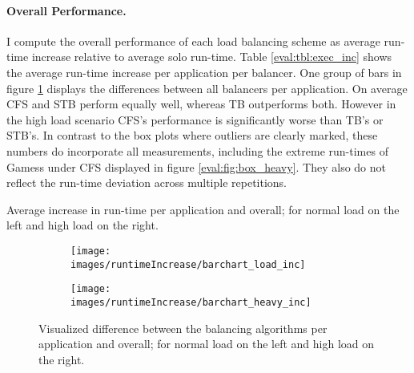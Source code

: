 \paragraph{Overall Performance.}
I compute the overall performance of each load balancing scheme as average
run-time increase relative to average solo run-time.
Table \ref{eval:tbl:exec_inc} shows the average run-time increase per
application per balancer.
One group of bars in figure \ref{eval:fig:exec_inc} displays the differences
between all balancers per application.
On average CFS and STB perform equally well, whereas TB outperforms both.
However in the high load scenario CFS's performance is significantly worse
than TB's or STB's.
In contrast to the box plots where outliers are clearly marked, these numbers
do incorporate all measurements, including the extreme
run-times of Gamess under CFS displayed in figure \ref{eval:fig:box_heavy}.
They also do not reflect the run-time deviation across multiple repetitions.
%
\begin{table}[h!]
  
  \caption{Average increase in run-time per application and overall; for
    normal load on the left and high load on the right.}
  \label{eval:tbl:exec_inc}
\end{table}
%
\begin{figure}[h!]
  \begin{subfigure}{.49\textwidth}
  \texttt{[image: images/runtimeIncrease/barchart\_load\_inc]}
  \end{subfigure}
  \begin{subfigure}{.49\textwidth}
  \texttt{[image: images/runtimeIncrease/barchart\_heavy\_inc]}
  \end{subfigure}
  \caption{Visualized difference between the balancing algorithms per
    application and overall; for normal load on the left and high load on the
    right.}
  \label{eval:fig:exec_inc}
\end{figure}
